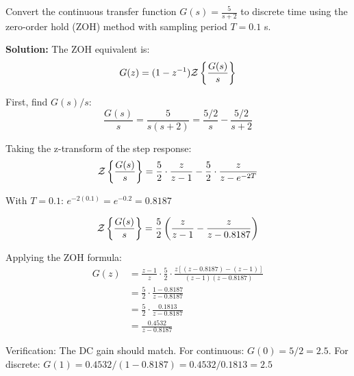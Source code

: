 \begin{example}
Convert the continuous transfer function $G(s) = \frac{5}{s+2}$ to discrete time using the zero-order hold (ZOH) method with sampling period $T = 0.1$ s.

\textbf{Solution:} The ZOH equivalent is:
\begin{equation}
G(z) = (1 - z^{-1}) \mathcal{Z}\left\{\frac{G(s)}{s}\right\}
\end{equation}

First, find $G(s)/s$:
\begin{equation}
\frac{G(s)}{s} = \frac{5}{s(s+2)} = \frac{5/2}{s} - \frac{5/2}{s+2}
\end{equation}

Taking the z-transform of the step response:
\begin{equation}
\mathcal{Z}\left\{\frac{G(s)}{s}\right\} = \frac{5}{2} \cdot \frac{z}{z-1} - \frac{5}{2} \cdot \frac{z}{z-e^{-2T}}
\end{equation}

With $T = 0.1$: $e^{-2(0.1)} = e^{-0.2} = 0.8187$

\begin{equation}
\mathcal{Z}\left\{\frac{G(s)}{s}\right\} = \frac{5}{2} \left(\frac{z}{z-1} - \frac{z}{z-0.8187}\right)
\end{equation}

Applying the ZOH formula:
\begin{align}
G(z) &= \frac{z-1}{z} \cdot \frac{5}{2} \cdot \frac{z[(z-0.8187) - (z-1)]}{(z-1)(z-0.8187)} \\
&= \frac{5}{2} \cdot \frac{1-0.8187}{z-0.8187} \\
&= \frac{5}{2} \cdot \frac{0.1813}{z-0.8187} \\
&= \frac{0.4532}{z-0.8187}
\end{align}

Verification: The DC gain should match. For continuous: $G(0) = 5/2 = 2.5$. For discrete: $G(1) = 0.4532/(1-0.8187) = 0.4532/0.1813 = 2.5$ \checkmark
\end{example}

